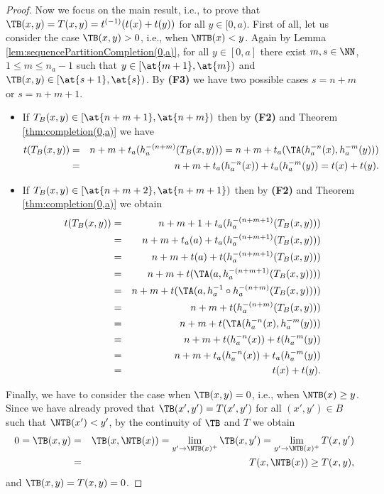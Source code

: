 \begin{proof}
	Now we focus on the main result, i.e., to prove that $\TB(x,y)=T(x,y)=t^{(-1)}(t(x)+t(y))$ for all $y \in [0,a)$. First of all, let us consider the case $\TB(x,y)>0$, i.e., when $\NTB(x)<y$. Again by Lemma \ref{lem:sequencePartitionCompletion(0,a)}, for all $y \in [0,a]$ there exist $m,s \in \NN$, $1 \leq m \leq n_a-1$ such that $y \in [\at{m+1},\at{m})$ and $\TB(x,y) \in [\at{s+1},\at{s})$. By {\bf (F3)} we have two possible cases $s=n+m$ or $s=n+m+1$.
		\begin{itemize}
			\item If $T_B(x,y) \in [\at{n+m+1},\at{n+m})$ then by {\bf (F2)} and Theorem  \ref{thm:completion(0,a)} we have
			\begin{eqnarray*}
				t(T_B(x,y)) &=& n+m +t_a(h_a^{-(n+m)}(T_B(x,y))) = n+m+t_a(\TA(h_a^{-n}(x),h_a^{-m}(y))) \\
				&=& n+m+t_a(h_a^{-n}(x)) +t_a(h_a^{-m}(y)) = t(x)+t(y).
			\end{eqnarray*}
			\item If $T_B(x,y) \in [\at{n+m+2},\at{n+m+1})$ then by {\bf (F2)} and Theorem  \ref{thm:completion(0,a)} we obtain
			\begin{eqnarray*}
				t(T_B(x,y))&=&n+m+1+t_a(h_a^{-(n+m+1)}(T_B(x,y))) \\
				& = & n+m+t_a(a)+t_a(h_a^{-(n+m+1)}(T_B(x,y))) \\
				& = & n+m+t(a)+t(h_a^{-(n+m+1)}(T_B(x,y))) \\
				& = & n+m + t(\TA(a,h_a^{-(n+m+1)}(T_B(x,y)))) \\
				& = & n+m + t(\TA(a,h_a^{-1} \circ h_a^{-(n+m)}(T_B(x,y)))) \\
				& = & n+m +t(h_a^{-(n+m)}(T_B(x,y))) \\
				& = & n+m+t(\TA(h_a^{-n}(x),h_a^{-m}(y))) \\
				& = &   n+m+ t(h_a^{-n}(x)) + t(h_a^{-m}(y))\\
				& = & n+m+ t_a(h_a^{-n}(x)) + t_a(h_a^{-m}(y)) \\
				& = & t(x)+t(y).
			\end{eqnarray*}
		\end{itemize}
	Finally, we have to consider the case when $\TB(x,y)=0$, i.e., when $\NTB(x) \geq y$. Since we have already proved that $\TB(x',y')=T(x',y')$ for all $(x',y') \in B$ such that $\NTB(x')<y'$, by the continuity of $\TB$ and $T$ we obtain
	\begin{eqnarray*}
	0 = \TB(x,y) &=& \TB(x,\NTB(x)) = \lim_{y' \to \NTB(x)^{+}} \TB(x,y') = \lim_{y' \to \NTB(x)^{+}} T(x,y') \\
	&=& T(x,\NTB(x)) \geq T(x,y),
	\end{eqnarray*}
	and $\TB(x,y)=T(x,y)=0$.
\end{proof}

